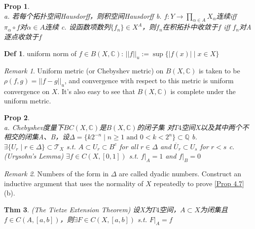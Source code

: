 \documentclass[hidelinks]{article}
\theoremstyle{definition}
\newtheorem*{defin}{Def}
\theoremstyle{plain}
\newtheorem{theorem}{Thm}[section]
\newtheorem{proposition}[theorem]{Prop}
\theoremstyle{remark}
\newtheorem*{remark}{Remark}
\begin{document}
\begin{proposition}\label{Prop 4.6}~\\
a. 若每个拓扑空间Hausdorff，则积空间Hausdorff\newline
b. $f:Y\to \prod_{\alpha \in A}X_\alpha$连续iff $\pi_\alpha \circ f$对$\alpha \in A$连续 \newline
c. 设函数项数列$\{f_n\}\in X^A$，则$f_n$在积拓扑中收敛于$f$ iff $f_n$对A逐点收敛于$f$
\end{proposition}

\begin{defin}
uniform norm of $f\in B(X,\mathbb{C})$: $||f||_u:=\sup{\{|f(x)|\mid x\in X\}}$
\end{defin}

\begin{remark}
Uniform metric (or Chebyshev metric) on $B(X,\mathbb{C})$ is taken to be $\rho(f,g)=||f-g||_u$, and convergence with respect to this metric is uniform convergence on $X$. It's also easy to see that $B(X,\mathbb{C})$ is complete under the uniform metric.
\end{remark}

\begin{proposition}\label{Prop 4.7}~\\
a. Chebyshev度量下$BC(X,\mathbb{C})$是$B(X,\mathbb{C})$的闭子集 \newline
对$T4$空间X以及其中两个不相交的闭集A、B，设$\Delta=\{k2^{-n}\mid n\geq 1 \textrm{ and } 0<k<2^n\}\subset \mathbb{Q}$ \newline
b. $\exists \{U_r\mid r\in \Delta\}\subset \mathscr{T}_X $ s.t. $A\subset U_r\subset B^c$ for all $r\in \Delta$ and $\overline{U}_r\subset U_s$ for $r<s$ \newline
c. (Urysohn's Lemma) $\exists f\in C(X,[0,1])$ s.t. $\left.f\right|_A=1$ and $\left.f\right|_B=0$
\end{proposition}

\begin{remark}
Numbers of the form in $\Delta$ are called dyadic numbers. Construct an inductive argument that uses the normality of $X$ repeatedly to prove \autoref{Prop 4.7} (b).
\end{remark}

\begin{theorem}\label{Prop 4.8} (The Tietze Extension Theorem) \newline
设X为$T4$空间，$A\subset X$为闭集且$f\in C(A,[a,b])$，则$\exists F\in C(X,[a,b])$ s.t. $\left.F\right|_A=f$
\end{theorem}
\end{document}
